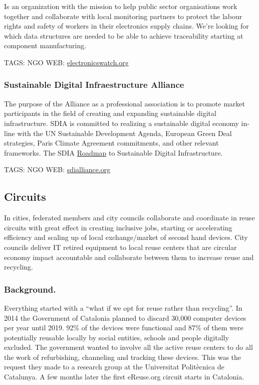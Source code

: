\documentclass[
]{book}
\begin{document}
Is an organization with the mission to help public sector organisations work together and collaborate with local monitoring partners to protect the labour rights and safety of workers in their electronics supply chains. We're looking for which data structures are needed to be able to achieve traceability starting at component manufacturing.

TAGS: NGO
WEB: \href{https://electronicswatch.org/en}{electronicswatch.org}

\hypertarget{sustainable-digital-infraestructure-alliance}{%
\subsubsection{Sustainable Digital Infraestructure Alliance}\label{sustainable-digital-infraestructure-alliance}}

The purpose of the Alliance as a professional association is to promote market participants in the field of creating and expanding sustainable digital infrastructure. SDIA is committed to realizing a sustainable digital economy in-line with the UN Sustainable Development Agenda, European Green Deal strategies, Paris Climate Agreement commitments, and other relevant frameworks. The SDIA \href{https://sdialliance.org/roadmap}{Roadmap} to Sustainable Digital Infrastructure.

TAGS: NGO
WEB: \href{https://sdialliance.org}{sdialliance.org}

\hypertarget{circuits}{%
\subsection{Circuits}\label{circuits}}

In cities, federated members and city councils collaborate and coordinate in reuse circuits with great effect in creating inclusive jobs, starting or accelerating efficiency and scaling up of local exchange/market of second hand devices. City councils deliver IT retired equipment to local reuse centers that are circular economy impact accountable and collaborate between them to increase reuse and recycling.

\hypertarget{background.}{%
\subsubsection{Background.}\label{background.}}

Everything started with a ``what if we opt for reuse rather than recycling''. In 2014 the Government of Catalonia planned to discard 30,000 computer devices per year until 2019. 92\% of the devices were functional and 87\% of them were potentially reusable locally by social entities, schools and people digitally excluded. The government wanted to involve all the active reuse centers to do all the work of refurbishing, channeling and tracking these devices. This was the request they made to a research group at the Universitat Politècnica de Catalunya. A few months later the first eReuse.org circuit starts in Catalonia.
\end{document}

